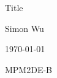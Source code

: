 \documentclass[12pt]{article}
\begin{document}
\begin{titlepage}

\begin{center}
    \Huge{Title}
    
    \vspace{1in}
    
    \Large{Simon Wu}
    
    \Large{\today}
    
    \vspace{1in}
    
    \Large{MPM2DE-B}

    
\end{center}

\tableofcontents

\end{titlepage}
\end{document}

